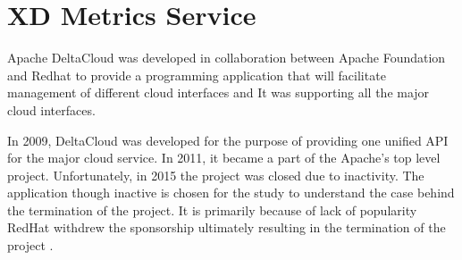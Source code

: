 \section{XD Metrics Service}

Apache DeltaCloud was developed in collaboration between Apache Foundation and Redhat to provide a programming application that will 
facilitate management of different cloud interfaces and
It was supporting all the major cloud interfaces. 

In 2009, DeltaCloud was developed for the purpose of providing one unified API for the major cloud service. 
In 2011, it became a part of the Apache’s top level project. Unfortunately, in 2015 the project was closed due to inactivity. 
The application though inactive is chosen for the study to understand the case behind the termination of the project. 
It is primarily because of lack of popularity RedHat withdrew the sponsorship ultimately resulting in the 
termination of the project \cite{hid-sp18-417-wiki-deltacloud}.
